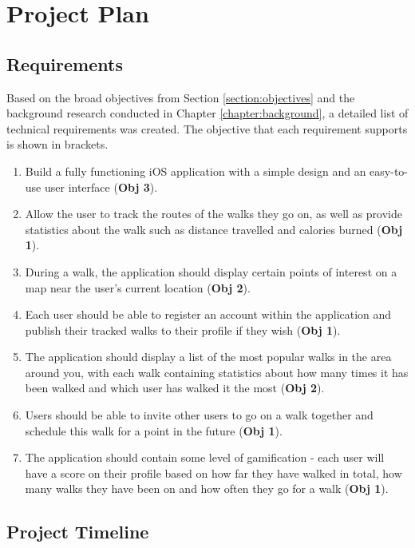 \chapter{Project Plan}

\section{Requirements} \label{section:requirements}

Based on the broad objectives from Section \ref{section:objectives} and the background research conducted in Chapter \ref{chapter:background}, a detailed list of technical requirements was created. The objective that each requirement supports is shown in brackets.


\begin{enumerate}[label=\textbf{Req \arabic*}]
    \item Build a fully functioning iOS application with a simple design and an easy-to-use user interface (\textbf{Obj 3}).
    \item Allow the user to track the routes of the walks they go on, as well as provide statistics about the walk such as distance travelled and calories burned (\textbf{Obj 1}).
    \item During a walk, the application should display certain points of interest on a map near the user's current location (\textbf{Obj 2}).
    \item Each user should be able to register an account within the application and publish their tracked walks to their profile if they wish (\textbf{Obj 1}).
    \item The application should display a list of the most popular walks in the area around you, with each walk containing statistics about how many times it has been walked and which user has walked it the most (\textbf{Obj 2}).
    \item Users should be able to invite other users to go on a walk together and schedule this walk for a point in the future (\textbf{Obj 1}).
    \item The application should contain some level of gamification - each user will have a score on their profile based on how far they have walked in total, how many walks they have been on and how often they go for a walk (\textbf{Obj 1}).
\end{enumerate}

\section{Project Timeline} \label{section:project-timeline}

